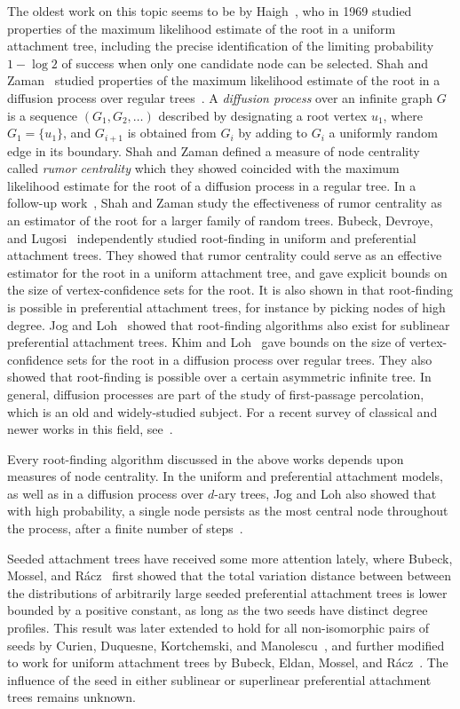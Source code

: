 The oldest work on this topic seems to be by Haigh~\cite{haigh}, who
in 1969 studied properties of the maximum likelihood estimate of the
root in a uniform attachment tree, including the precise
identification of the limiting probability $1 - \log 2$ of success
when only one candidate node can be selected. Shah and
Zaman~\cite{shah-zaman} studied properties of the maximum likelihood
estimate of the root in a diffusion process over regular
trees~\cite{shah-zaman}. A \emph{diffusion process} over an infinite
graph $G$ is a sequence $(G_1, G_2, \dots)$ described by designating a
root vertex $u_1$, where $G_1 = \{u_1\}$, and $G_{i + 1}$ is obtained
from $G_i$ by adding to $G_i$ a uniformly random edge in its
boundary. Shah and Zaman defined a measure of node centrality called
\emph{rumor centrality} which they showed coincided with the maximum
likelihood estimate for the root of a diffusion process in a regular
tree. In a follow-up work~\cite{shah-zaman-2}, Shah and Zaman study
the effectiveness of rumor centrality as an estimator of the root for
a larger family of random trees. Bubeck, Devroye, and
Lugosi~\cite{finding-adam} independently studied root-finding in
uniform and preferential attachment trees. They showed that rumor
centrality could serve as an effective estimator for the root in a
uniform attachment tree, and gave explicit bounds on the size of
vertex-confidence sets for the root. It is also shown in
\cite{finding-adam} that root-finding is possible in preferential
attachment trees, for instance by picking nodes of high degree. Jog
and Loh~\cite{ling-centrality} showed that root-finding algorithms
also exist for sublinear preferential attachment trees. Khim and
Loh~\cite{khim-confidence} gave bounds on the size of
vertex-confidence sets for the root in a diffusion process over
regular trees. They also showed that root-finding is possible over a
certain asymmetric infinite tree. In general, diffusion processes are
part of the study of first-passage percolation, which is an old and
widely-studied subject. For a recent survey of classical and newer
works in this field, see~\cite{fpp}.

Every root-finding algorithm discussed in the above works depends upon
measures of node centrality. In the uniform and preferential
attachment models, as well as in a diffusion process over $d$-ary
trees, Jog and Loh also showed that with high probability, a single
node persists as the most central node throughout the process, after a
finite number of steps~\cite{jog-persistence}.

Seeded attachment trees have received some more attention lately,
where Bubeck, Mossel, and R\'{a}cz~\cite{bubeck-influence1} first
showed that the total variation distance between between the
distributions of arbitrarily large seeded preferential attachment
trees is lower bounded by a positive constant, as long as the two
seeds have distinct degree profiles. This result was later extended to
hold for all non-isomorphic pairs of seeds by Curien, Duquesne,
Kortchemski, and Manolescu~\cite{curien-influence}, and further
modified to work for uniform attachment trees by Bubeck, Eldan,
Mossel, and R\'{a}cz~\cite{seed-influence}. The influence of the seed
in either sublinear or superlinear preferential attachment trees
remains unknown.

